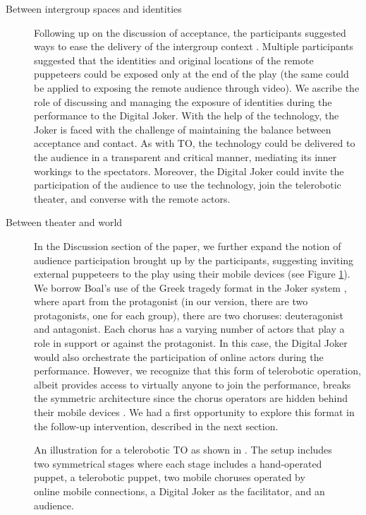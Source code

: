 \documentclass[dissertation,math,vertlayout,pdfa,colorlinks,nologo]{aaltoseries}
\begin{document}
\begin{description}
   \item[Between intergroup spaces and identities] Following up on the discussion of acceptance, the participants suggested ways to ease the delivery of the intergroup context \cite[p. 16]{peledTeleroboticTheaterOppressed2025}. Multiple participants suggested that the identities and original locations of the remote puppeteers could be exposed only at the end of the play (the same could be applied to exposing the remote audience through video). We ascribe the role of discussing and managing the exposure of identities during the performance to the Digital Joker. With the help of the technology, the Joker is faced with the challenge of maintaining the balance between acceptance and contact. As with TO, the technology could be delivered to the audience in a transparent and critical manner, mediating its inner workings to the spectators. Moreover, the Digital Joker could invite the participation of the audience to use the technology, join the telerobotic theater, and converse with the remote actors.
   \item[Between theater and world] In the Discussion section of the paper, we further expand the notion of audience participation brought up by the participants, suggesting inviting external puppeteers to the play using their mobile devices \cite[p. 20]{peledTeleroboticTheaterOppressed2025} (see Figure \ref{fig:telerobotic-to}). We borrow Boal's use of the Greek tragedy format in the Joker system \cite[p. 160]{boalTheatreOppressed2008}, where apart from the protagonist (in our version, there are two protagonists, one for each group), there are two choruses: deuteragonist and antagonist. Each chorus has a varying number of actors that play a role in support or against the protagonist. In this case, the Digital Joker would also orchestrate the participation of online actors during the performance. However, we recognize that this form of telerobotic operation, albeit provides access to virtually anyone to join the performance, breaks the symmetric architecture since the chorus operators are hidden behind their mobile devices \cite[p. 20]{peledTeleroboticTheaterOppressed2025}. We had a first opportunity to explore this format in the follow-up intervention, described in the next section.
\end{description}


\begin{figure}
    \centering
    
    \caption{An illustration for a telerobotic TO as shown in \cite{peledTeleroboticTheaterOppressed2025}. The setup includes two symmetrical stages where each stage includes a hand-operated puppet, a telerobotic puppet, two mobile choruses operated by online mobile connections, a Digital Joker as the facilitator, and an audience.}
    \label{fig:telerobotic-to}
\end{figure}
\end{document}
